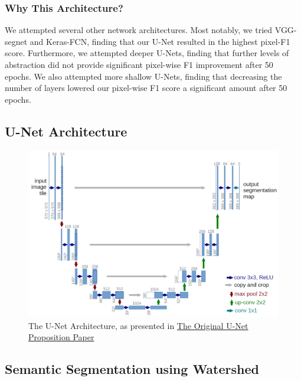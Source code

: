 \documentclass[paper=letter, fontsize=12pt]{article}
\numberwithin{equation}{section} %
\numberwithin{figure}{section} %
\numberwithin{table}{section} %
\begin{document}
\subsubsection{Why This Architecture?}
We attempted several other network architectures. Most notably, we tried
VGG-segnet and Keras-FCN, finding that our U-Net resulted in the highest
pixel-F1 score. Furthermore, we attempted deeper U-Nets, finding that further
levels of abstraction did not provide significant pixel-wise F1 improvement
after 50 epochs. We also attempted more shallow U-Nets, finding that
decreasing the number of layers lowered our pixel-wise F1 score a significant
amount after 50 epochs.

\begin{appendixatend}
    \subsection{U-Net Architecture}
    \begin{figure}
        \centering
        \includegraphics[width=\textwidth]{./figs/unet_architecture.png}
        \caption{The U-Net Architecture, as presented in  \href{https://arxiv.org/pdf/1505.04597.pdf}{The Original U-Net Proposition Paper} }
        \label{fig:unet-architecture}
    \end{figure}
\end{appendixatend}

\subsection{Semantic Segmentation using Watershed}
\end{document}

